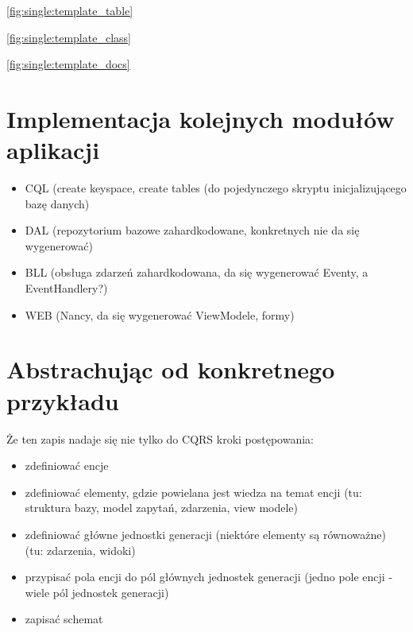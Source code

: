 \ref{fig:single:template_table}


\ref{fig:single:template_class}


\ref{fig:single:template_docs}




\section{Implementacja kolejnych modułów aplikacji}

\begin{itemize}
 \item CQL (create keyspace, create tables (do pojedynczego skryptu inicjalizującego bazę danych)
 \item DAL (repozytorium bazowe zahardkodowane, konkretnych nie da się wygenerować)
 \item BLL (obsługa zdarzeń zahardkodowana, da się wygenerować Eventy, a EventHandlery?)
 \item WEB (Nancy, da się wygenerować ViewModele, formy)
\end{itemize}



\section{Abstrachując od konkretnego przykładu}

Że ten zapis nadaje się nie tylko do CQRS
kroki postępowania:

\begin{itemize}
 \item zdefiniować encje
 \item zdefiniować elementy, gdzie powielana jest wiedza na temat encji (tu: struktura bazy, model zapytań, zdarzenia, view modele)
 \item zdefiniować główne jednostki generacji (niektóre elementy są równoważne) (tu: zdarzenia, widoki)
 \item przypisać pola encji do pól głównych jednostek generacji (jedno pole encji - wiele pól jednostek generacji)
 \item zapisać schemat
\end{itemize}

